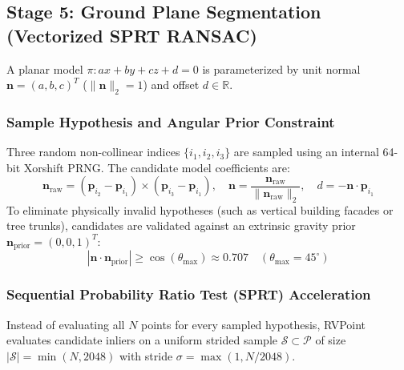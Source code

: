 \documentclass[journal,compsoc]{IEEEtran}
\begin{document}
\subsection{Stage 5: Ground Plane Segmentation (Vectorized SPRT RANSAC)}
\label{sec:ransac}

A planar model $\pi: ax + by + cz + d = 0$ is parameterized by unit normal $\bm{n} = (a, b, c)^T$ ($\|\bm{n}\|_2 = 1$) and offset $d \in \mathbb{R}$.

\subsubsection{Sample Hypothesis and Angular Prior Constraint}
Three random non-collinear indices $\{i_1, i_2, i_3\}$ are sampled using an internal 64-bit Xorshift PRNG. The candidate model coefficients are:
\begin{equation}
\bm{n}_{\text{raw}} = (\bm{p}_{i_2} - \bm{p}_{i_1}) \times (\bm{p}_{i_3} - \bm{p}_{i_1}), \quad \bm{n} = \frac{\bm{n}_{\text{raw}}}{\|\bm{n}_{\text{raw}}\|_2}, \quad d = -\bm{n} \cdot \bm{p}_{i_1}
\label{eq:plane_cross}
\end{equation}
To eliminate physically invalid hypotheses (such as vertical building facades or tree trunks), candidates are validated against an extrinsic gravity prior $\bm{n}_{\text{prior}} = (0, 0, 1)^T$:
\begin{equation}
\left| \bm{n} \cdot \bm{n}_{\text{prior}} \right| \ge \cos(\theta_{\max}) \approx 0.707 \quad (\theta_{\max} = 45^\circ)
\label{eq:normal_prior}
\end{equation}

\subsubsection{Sequential Probability Ratio Test (SPRT) Acceleration}
Instead of evaluating all $N$ points for every sampled hypothesis, RVPoint evaluates candidate inliers on a uniform strided sample $\mathcal{S} \subset \mathcal{P}$ of size $|\mathcal{S}| = \min(N, 2048)$ with stride $\sigma = \max(1, N/2048)$.
\end{document}
